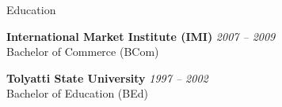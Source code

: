 \documentclass{resume} %
\begin{document}

\begin{rSection}{Education}

{\bf International Market Institute (IMI)} \hfill {{\em 2007 -- 2009\/} \\ %
Bachelor of Commerce (BCom)
}

{\bf Tolyatti State University} \hfill {{\em 1997 -- 2002\/} \\ %
Bachelor of Education (BEd)
}

\end{rSection}

\end{document}
